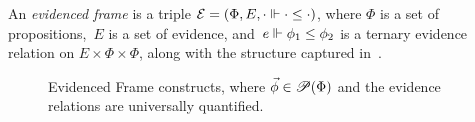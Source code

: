 \documentclass[a4paper,UKenglish,cleveref, autoref, thm-restate]{lipics-v2021}
\begin{document}
\begin{definition}\label{evidenced-frame}
An \emph{evidenced frame} is a triple $\mathcal{E} = \left( \Phi, E, \cdot \Vdash \cdot \leq \cdot \right)$, where $\Phi$ is a set of propositions,~$E$ is a set of evidence, and~\mbox{$e \Vdash \phi_1 \leq \phi_2$} is a ternary evidence relation on $E \times \Phi \times \Phi$,
along with the structure captured in~.
\end{definition}
\begin{figure}[t]
\centering
\caption{Evidenced Frame constructs, where $\vec{\phi}\in\mathscr{P}(\Phi)$ and the evidence relations are universally quantified.}
\label{tab:EF}
\end{figure}
\end{document}
